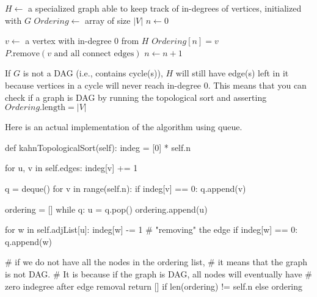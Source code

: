 \noindent \hrulefill
\begin{algorithmic}[1]
   
    \State $H \gets$ a specialized graph able to keep track of in-degrees of vertices, initialized with $G$
    \State $Ordering \gets$ array of size $|V|$
    \State $n \gets 0$
    \item[]
      \State $v \gets$ a vertex with in-degree 0 from $H$
      \State $Ordering[n] = v$
      \State $P.\text{remove}(v \text{ and all connect edges})$
      \State $n \gets n + 1$
    \EndWhile
  \EndFunction
\end{algorithmic}
\noindent \hrulefill

\noindent If $G$ is not a DAG (i.e., contains cycle(s)), $H$ will still have edge(s) left in it because vertices in a cycle will never reach in-degree 0.
This means that you can check if a graph is DAG by running the topological sort and asserting $Ordering.\text{length} = |V|$

\noindent Here is an actual implementation of the algorithm using queue.

\begin{python}
    def kahnTopologicalSort(self):
        indeg = [0] * self.n

        for u, v in self.edges:
            indeg[v] += 1

        q = deque()
        for v in range(self.n):
            if indeg[v] == 0:
                q.append(v)

        ordering = []
        while q:
            u = q.pop()
            ordering.append(u)

            for w in self.adjList[u]:
                indeg[w] -= 1  # "removing" the edge
                if indeg[w] == 0:
                    q.append(w)

        # if we do not have all the nodes in the ordering list,
        # it means that the graph is not DAG.
        # It is because if the graph is DAG, all nodes will eventually have
        # zero indegree after edge removal
        return [] if len(ordering) != self.n else ordering
\end{python}
